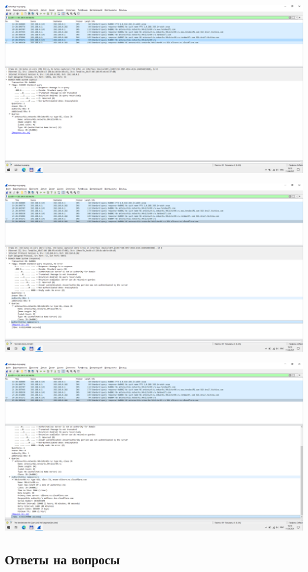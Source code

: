 \begin{center}
    \includegraphics[width=\textwidth]{screenshots/nslookup-ns_request_1}

    \includegraphics[width=\textwidth]{screenshots/nslookup-ns_response_1}

    \includegraphics[width=\textwidth]{screenshots/nslookup-ns_response_2}

\end{center}

\subsection{Ответы на вопросы}

